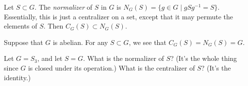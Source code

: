 \begin{definition}[Normalizer]
Let $S \subset G$. The \emph{normalizer} of $S$ in $G$ is $N_G(S) = \{g \in G \mid gSg^{-1} = S\}$. Essentially, this is just a centralizer on a set, except that it may permute the elements of $S$. Then $C_G(S) \subset N_G(S)$.
\end{definition}

\begin{example}
Suppose that $G$ is abelian. For any $S \subset G$, we see that $C_G(S) = N_G(S) = G$.
\end{example}

\begin{example}
Let $G = S_3$, and let $S = G$. What is the normalizer of $S$? (It's the whole thing since $G$ is closed under its operation.) What is the centralizer of $S$? (It's the identity.)
\end{example}